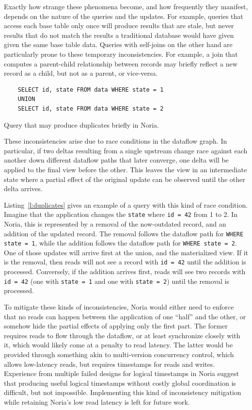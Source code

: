 Exactly how strange these phenomena become, and how frequently they manifest,
depends on the nature of the queries and the updates. For example, queries that
access each base table only once will produce results that are stale, but never
results that do not match the results a traditional database would have given
given the same base table data. Queries with self-joins on the other hand are
particularly prone to these temporary inconsistencies. For example, a join that
computes a parent-child relationship between records may briefly reflect a new
record as a child, but not as a parent, or vice-versa.

\begin{listing}[h]
  \begin{verbatim}
    SELECT id, state FROM data WHERE state = 1
    UNION
    SELECT id, state FROM data WHERE state = 2
  \end{verbatim}
  \caption{Query that may produce duplicates briefly in Noria.}
  \label{l:duplicates}
\end{listing}

These inconsistencies arise due to race conditions in the dataflow graph. In
particular, if two deltas resulting from a single upstream change race against
each another down different dataflow paths that later converge, one delta will
be applied to the final view before the other. This leaves the view in an
intermediate state where a partial effect of the original update can be observed
until the other delta arrives.

Listing~\vref{l:duplicates} gives an example of a query with this kind of race
condition. Imagine that the application changes the \texttt{state} where
\texttt{id = 42} from 1 to 2. In Noria, this is represented by a removal of the
now-outdated record, and an addition of the updated record. The removal follows
the dataflow path for \texttt{WHERE state = 1}, while the addition follows the
dataflow path for \texttt{WHERE state = 2}. One of those updates will arrive
first at the union, and the materialized view. If it is the removal, then reads
will not see a record with \texttt{id = 42} until the addition is processed.
Conversely, if the addition arrives first, reads will see two records with
\texttt{id = 42} (one with \texttt{state = 1} and one with \texttt{state = 2})
until the removal is processed.

To mitigate these kinds of inconsistencies, Noria would either need to enforce
that no reads can happen between the application of one ``half'' and the other,
or somehow hide the partial effects of applying only the first part. The former
requires reads to flow through the dataflow, or at least synchronize closely
with it, which would likely come at a penalty to read latency. The latter would
be provided through something akin to multi-version concurrency control, which
allows low-latency reads, but requires timestamps for reads and writes.
Experience from multiple failed designs for logical timestamps in Noria suggest
that producing useful logical timestamps without costly global coordination is
difficult, but not impossible. Implementing this kind of inconsistency
mitigation while retaining Noria's low read latency is left for future work.

